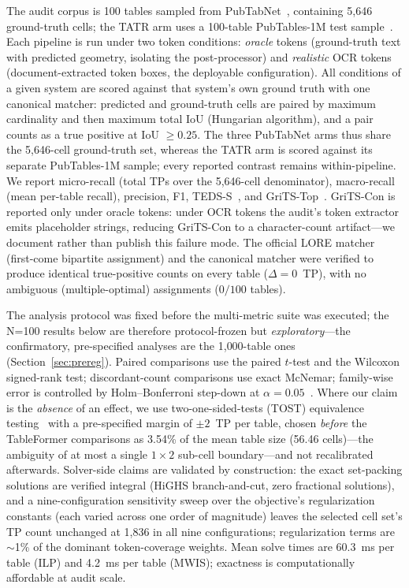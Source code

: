 \documentclass[final,5p,times,twocolumn]{elsarticle}
\begin{document}
The audit corpus is 100 tables sampled from PubTabNet~\cite{zhong2020},
containing 5{,}646 ground-truth cells; the TATR arm uses a 100-table
PubTables-1M test sample~\cite{smock2022pubtables1m}. Each pipeline is run
under two token conditions: \emph{oracle} tokens (ground-truth text with
predicted geometry, isolating the post-processor) and \emph{realistic} OCR
tokens (document-extracted token boxes, the deployable configuration). All
conditions of a given system are scored against that system's own ground
truth with one canonical matcher: predicted and ground-truth cells are paired
by maximum cardinality and then maximum total IoU (Hungarian algorithm), and
a pair counts as a true positive at IoU $\geq 0.25$. The three PubTabNet arms
thus share the 5{,}646-cell ground-truth set, whereas the TATR arm is scored
against its separate PubTables-1M sample; every reported contrast remains
within-pipeline. We report micro-recall (total TPs
over the 5{,}646-cell denominator), macro-recall (mean per-table recall),
precision, F1, TEDS-S~\cite{zhong2020}, and GriTS-Top~\cite{smock2023grits}.
GriTS-Con is reported only under oracle tokens: under OCR tokens the audit's
token extractor emits placeholder strings, reducing GriTS-Con to a
character-count artifact---we document rather than publish this failure mode. The official LORE matcher (first-come bipartite
assignment) and the canonical matcher were verified to produce identical
true-positive counts on every table ($\Delta = 0$~TP), with no ambiguous
(multiple-optimal) assignments ($0/100$ tables).

The analysis protocol was fixed before the multi-metric suite was executed;
the N=100 results below are therefore protocol-frozen but
\emph{exploratory}---the confirmatory, pre-specified analyses are the
1{,}000-table ones (Section~\ref{sec:prereg}). Paired comparisons use the
paired $t$-test and the Wilcoxon signed-rank test; discordant-count
comparisons use exact McNemar; family-wise error is controlled by
Holm--Bonferroni step-down at $\alpha{=}0.05$~\cite{holm1979}. Where our claim
is the \emph{absence} of an effect, we use two-one-sided-tests (TOST)
equivalence testing~\cite{lakens2017} with a pre-specified margin of
$\pm 2$~TP per table, chosen \emph{before} the TableFormer comparisons as
3.54\% of the mean table size (56.46 cells)---the ambiguity of at most a
single $1\times 2$ sub-cell boundary---and not recalibrated afterwards.
Solver-side claims are validated by construction: the exact set-packing
solutions are verified integral (HiGHS branch-and-cut, zero fractional
solutions), and a nine-configuration sensitivity sweep over the objective's
regularization constants (each varied across one order of magnitude) leaves
the selected cell set's TP count unchanged at 1{,}836 in all nine
configurations; regularization terms are $\sim$1\% of the dominant
token-coverage weights.
Mean solve times are 60.3~ms per table (ILP) and 4.2~ms per table (MWIS);
exactness is computationally affordable at audit scale.
\end{document}
